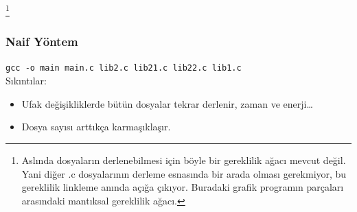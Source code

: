 \documentclass{beamer}
\begin{document}
{
\begin{frame}
   \footnote{Aslında dosyaların derlenebilmesi için böyle bir gereklilik ağacı mevcut değil. Yani diğer .c dosyalarının derleme esnasında bir arada olması gerekmiyor, bu gereklilik linkleme anında açığa çıkıyor. Buradaki grafik programın parçaları arasındaki mantıksal gereklilik ağacı.}

    
\end{frame}
}
{
\begin{frame}
    \frametitle{Naif Yöntem}
    \texttt{gcc -o main main.c lib2.c lib21.c lib22.c lib1.c}\\
    \vspace{4mm}
    Sıkıntılar:
    \begin{itemize}
        \item Ufak değişikliklerde bütün dosyalar tekrar derlenir, zaman ve enerji\ldots
        \item Dosya sayısı arttıkça karmaşıklaşır.
    \end{itemize}

    
\end{frame}
}
\end{document}

